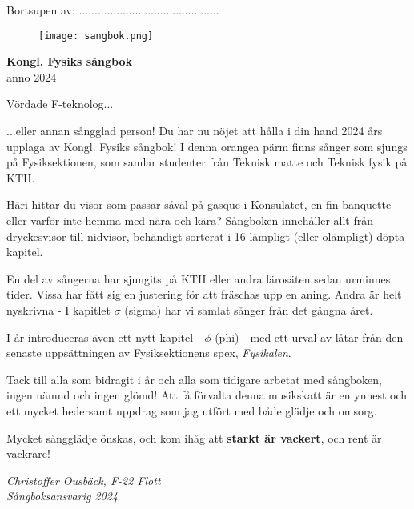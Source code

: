 \documentclass[a6paper,12pt]{article}
\begin{document}
\noindent Bortsupen av: .............................................
\vspace{50pt}
\begin{figure}[!h]
\centering
\texttt{[image: sangbok.png]}
\end{figure}
\vspace{-20pt}
\begin{center}
\Huge\textbf{Kongl. Fysiks sångbok} \\
\Large anno 2024
\end{center}

\newpage
\setlength{\oddsidemargin}{-0.57in}
\noindent
\Large Vördade F-teknolog... 

\footnotesize \noindent ...eller annan sångglad person!  
Du har nu nöjet att hålla i din hand 2024 års upplaga av Kongl. Fysiks sångbok!
I denna orangea pärm finns sånger som sjungs på Fysiksektionen, 
som samlar studenter från Teknisk matte och Teknisk fysik på KTH.

Häri hittar du visor som passar såväl på gasque i Konsulatet, 
en fin banquette eller varför inte hemma med nära och kära? 
Sångboken innehåller allt från dryckesvisor till nidvisor, behändigt
sorterat i 16 lämpligt (eller olämpligt) döpta kapitel.

En del av sångerna har sjungits på KTH eller andra lärosäten sedan urminnes tider.
Vissa har fått sig en justering för att fräschas upp en aning.
Andra är helt nyskrivna - I kapitlet $\sigma$ (sigma) har vi samlat sånger från det gångna året.

I år introduceras även ett nytt kapitel - $\phi$ (phi) - 
med ett urval av låtar från den senaste uppsättningen av Fysiksektionens spex, \textit{Fysikalen}.

Tack till alla som bidragit i år och alla som tidigare arbetat med sångboken, ingen nämnd och ingen glömd! 
Att få förvalta denna musikskatt är en
ynnest och ett mycket hedersamt uppdrag som jag utfört med både glädje och omsorg.

Mycket sångglädje önskas, och kom ihåg att \textbf{starkt
är vackert}, och rent är vackrare!

\begin{flushright}
\textit{Christoffer Ousbäck, F-22 Flott\\ Sångboksansvarig 2024}
\end{flushright}

\newpage

\end{document}
